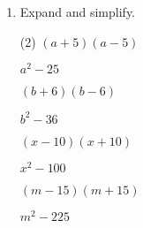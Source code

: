 \begin{enumerate} [leftmargin=0cm]
\begin{tasks}[label=(\alph*), after-item-skip=2pt,after-skip=3pt, label-width=4ex](2)
    \task  $ (a-30)^2   $    \\  \begin{envAnswer} $   a^2 -   60a +   900       $ \end{envAnswer}
    \task  $ (x- 6)^2   $    \\  \begin{envAnswer} $   x^2 -   12x +    36       $ \end{envAnswer}
    \task  $ (m- 5)^2   $    \\  \begin{envAnswer} $   m^2 -   10m +    25       $ \end{envAnswer}
    \task  $ (n- 1)^2   $    \\  \begin{envAnswer} $   n^2 -    2n +     1       $ \end{envAnswer}
\end{tasks}


\item Expand and simplify.
\begin{tasks}[label=(\alph*), after-item-skip=2pt,after-skip=3pt, label-width=4ex](2)
    \task  $ ( a+ 5) (a-5)                 $    \\  \begin{envAnswer} $   a^2   -   25        $ \end{envAnswer}
    \task  $ ( b+ 6) (b-6)                 $    \\  \begin{envAnswer} $   b^2   -   36        $ \end{envAnswer}
    \task  $ ( x-10) (x+10)                $    \\  \begin{envAnswer} $   x^2   -  100        $ \end{envAnswer}
    \task  $ ( m-15) (m+15)                $    \\  \begin{envAnswer} $   m^2   -  225        $ \end{envAnswer}
\end{tasks}

\clearpage


\end{enumerate}
